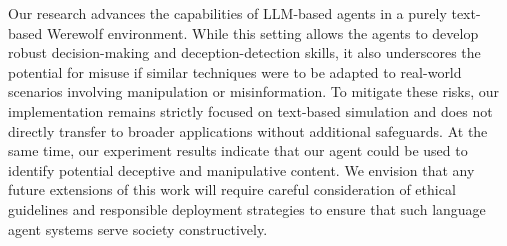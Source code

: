 Our research advances the capabilities of LLM-based agents in a purely text-based Werewolf environment. While this setting allows the agents to develop robust decision-making and deception-detection skills, it also underscores the potential for misuse if similar techniques were to be adapted to real-world scenarios involving manipulation or misinformation. To mitigate these risks, our implementation remains strictly focused on text-based simulation and does not directly transfer to broader applications without additional safeguards. At the same time, our experiment results indicate that our agent could be used to identify potential deceptive and manipulative content. We envision that any future extensions of this work will require careful consideration of ethical guidelines and responsible deployment strategies to ensure that such language agent systems serve society constructively.